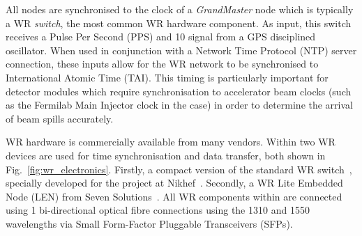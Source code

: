 All nodes are synchronised to the clock of a \emph{GrandMaster} node which is typically a WR
\emph{switch}, the most common WR hardware component. As input, this switch receives a Pulse Per
Second (PPS) and \unit{10}{} signal from a GPS disciplined oscillator. When used in
conjunction with a Network Time Protocol (NTP) server connection, these inputs allow for the WR
network to be synchronised to International Atomic Time (TAI). This timing is particularly
important for \chips detector modules which require synchronisation to accelerator beam clocks
(such as the Fermilab Main Injector clock in the \chipsfive case) in order to determine the
arrival of beam spills accurately.

WR hardware is commercially available from many vendors. Within \chipsfive two WR devices are used
for time synchronisation and data transfer, both shown in Fig.~\ref{fig:wr_electronics}. Firstly,
a compact version of the standard WR switch~\cite{wrswitch2020}, specially developed for the
\chips project at Nikhef~\cite{wrchromium2020}. Secondly, a WR Lite Embedded Node (LEN) from Seven
Solutions~\cite{wrlen2020}. All WR components within \chipsfive are connected using
\unit{1}{} bi-directional optical fibre connections using the \unit{1310}{}
and \unit{1550}{} wavelengths via Small Form-Factor Pluggable Transceivers (SFPs).

